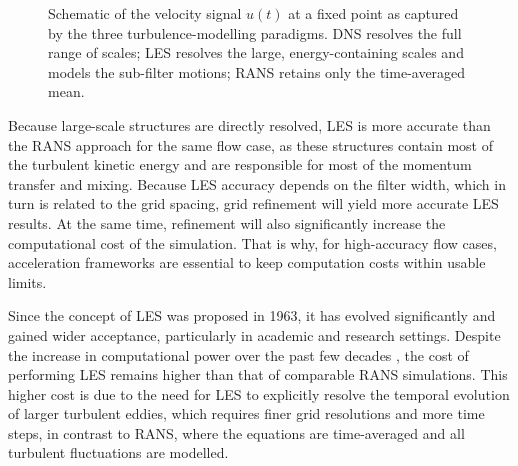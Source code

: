 \begin{figure}[htb]
{%
  }
  \caption{Schematic of the velocity signal $u(t)$ at a fixed point as captured by
  the three turbulence-modelling paradigms. DNS resolves the full range of scales;
  LES resolves the large, energy-containing scales and models the sub-filter
  motions; RANS retains only the time-averaged mean.}
  \label{fig: LES}
\end{figure}

Because large-scale structures are directly resolved, LES is more accurate than the RANS approach for the same flow case, as these structures contain most of the turbulent kinetic energy and are responsible for most of the momentum transfer and mixing. Because LES accuracy depends on the filter width, which in turn is related to the grid spacing, grid refinement will yield more accurate LES results. At the same time, refinement will also significantly increase the computational cost of the simulation. That is why, for high-accuracy flow cases, acceleration frameworks are essential to keep computation costs within usable limits. 

Since the concept of LES was proposed in 1963, it has evolved significantly and gained wider acceptance, particularly in academic and research settings. Despite the increase in computational power over the past few decades \cite{Shalf2020}, the cost of performing LES remains higher than that of comparable RANS simulations. This higher cost is due to the need for LES to explicitly resolve the temporal evolution of larger turbulent eddies, which requires finer grid resolutions and more time steps, in contrast to RANS, where the equations are time-averaged and all turbulent fluctuations are modelled.

